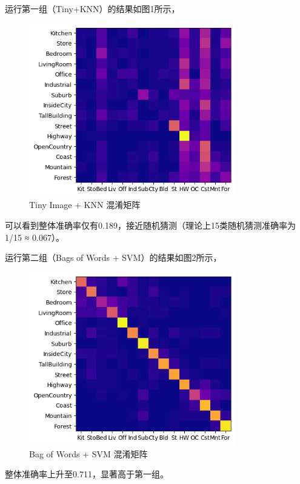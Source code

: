运行第一组（Tiny+KNN）的结果如图1所示，
\begin{figure}[hbt!]
    \centering
    \includegraphics[width=0.8\textwidth]{imgs/1.png} %
    \caption{Tiny Image + KNN 混淆矩阵}
    \label{图1：}
\end{figure}
可以看到整体准确率仅有0.189，接近随机猜测（理论上15类随机猜测准确率为1/15 ≈ 0.067）。

运行第二组（Bags of Words + SVM）的结果如图2所示，
\begin{figure}[hbt!]
    \centering
    \includegraphics[width=0.8\textwidth]{imgs/2.png} %
    \caption{Bag of Words + SVM 混淆矩阵}
    \label{图2：}
\end{figure}
整体准确率上升至0.711，显著高于第一组。
